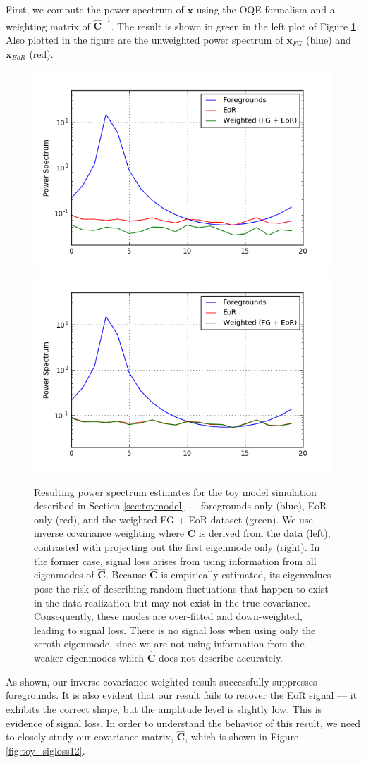 \documentclass[preprint2,numberedappendix,tighten]{aastex6}  %
\begin{document}
First, we compute the power spectrum of $\textbf{x}$ using the OQE formalism and a weighting matrix of $\hat{\textbf{C}}^{-1}$. The result is shown in green in the left plot of Figure \ref{fig:toy_sigloss3}. Also plotted in the figure are the unweighted power spectrum of $\textbf{x}_{FG}$ (blue) and $\textbf{x}_{EoR}$ (red). 

\begin{figure}
	\centering
	\includegraphics[trim={0.3cm 0.2cm 1cm 0.3cm},clip,height=0.3\textwidth]{plots/toy_sigloss3.png}
	\includegraphics[trim={1cm 0.2cm 0cm 0.3cm},clip,height=0.3\textwidth]{plots/toy_sigloss4.png}
	\caption{Resulting power spectrum estimates for the toy model simulation described in Section \ref{sec:toymodel} --- foregrounds only (blue), EoR only (red), and the weighted FG + EoR dataset (green). We use inverse covariance weighting where $\textbf{C}$ is derived from the data (left), contrasted with projecting out the first eigenmode only (right). In the former case, signal loss arises from using information from all eigenmodes of $\hat{\textbf{C}}$. Because $\hat{\textbf{C}}$ is empirically estimated, its eigenvalues pose the risk of describing random fluctuations that happen to exist in the data realization but may not exist in the true covariance. Consequently, these modes are over-fitted and down-weighted, leading to signal loss. There is no signal loss when using only the zeroth eigenmode, since we are not using information from the weaker eigenmodes which $\hat{\textbf{C}}$ does not describe accurately.}
	\label{fig:toy_sigloss3}
\end{figure}

As shown, our inverse covariance-weighted result successfully suppresses foregrounds. It is also evident that our result fails to recover the EoR signal --- it exhibits the correct shape, but the amplitude level is slightly low. This is evidence of signal loss. In order to understand the behavior of this result, we need to closely study our covariance matrix, $\hat{\textbf{C}}$, which is shown in Figure \ref{fig:toy_sigloss12}.
\end{document}
